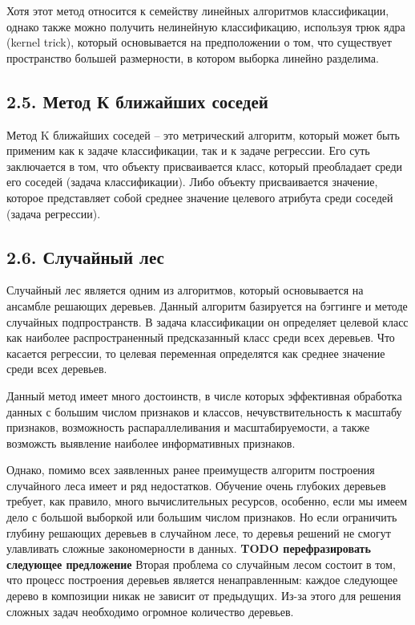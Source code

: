 Хотя этот метод относится к семейству линейных алгоритмов классификации, однако также можно получить нелинейную классификацию, используя трюк ядра (kernel trick), который основывается на предположении о том, что существует пространство большей размерности, в котором выборка линейно разделима. 

\subsection{2.5. Метод К ближайших соседей}

Метод K ближайших соседей \cite{knn} -- это метрический алгоритм, который может быть применим как к задаче классификации, так и к задаче регрессии. Его суть заключается в том, что объекту присваивается класс, который преобладает среди его соседей (задача классификации). Либо объекту присваивается значение, которое представляет собой среднее значение целевого атрибута среди соседей (задача регрессии). 

\subsection{2.6. Случайный лес}
Случайный лес \cite{random forest} является одним из алгоритмов, который основывается на ансамбле решающих деревьев. Данный алгоритм базируется на бэггинге и методе случайных подпространств. В задача классификации он определяет целевой класс как наиболее распространенный предсказанный класс среди всех деревьев. Что касается регрессии, то целевая переменная определятся как среднее значение среди всех деревьев.  

Данный метод имеет много достоинств, в числе которых эффективная обработка данных с большим числом признаков и классов, нечувствительность к масштабу признаков, возможность распараллеливания и масштабируемости, а также возможсть выявление наиболее информативных признаков.

Однако, помимо всех заявленных ранее преимуществ алгоритм построения случайного леса имеет и ряд недостатков. Обучение очень глубоких деревьев требует, как правило, много вычислительных ресурсов,
особенно, если мы имеем дело с большой выборкой или большим числом признаков. Но если ограничить глубину решающих деревьев в случайном лесе, то деревья решений не смогут улавливать сложные
закономерности в данных. \textbf{TODO перефразировать следующее предложение} Вторая проблема со случайным лесом состоит в том, что процесс построения деревьев является ненаправленным: каждое следующее дерево в композиции никак не зависит от предыдущих. Из-за этого для решения
сложных задач необходимо огромное количество деревьев.

